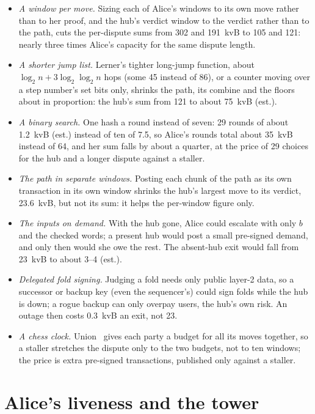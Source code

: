 \documentclass[11pt]{article}
\begin{document}
\begin{itemize}[leftmargin=1.5em]
\item \emph{A window per move.} Sizing each of Alice's windows to its
  own move rather than to her proof, and the hub's verdict window to the
  verdict rather than to the path, cuts the per-dispute sums from 302
  and 191~kvB to 105 and 121: nearly three times Alice's capacity for the
  same dispute length.
\item \emph{A shorter jump list.} Lerner's tighter long-jump function,
  about $\log_2 n + 3\log_2\log_2 n$ hops (some 45 instead of 86), or a
  counter moving over a step number's set bits only, shrinks the path,
  its combine and the floors about in proportion: the hub's sum from 121
  to about 75~kvB (est.).
\item \emph{A binary search.} One hash a round instead of seven: 29
  rounds of about 1.2~kvB (est.) instead of ten of 7.5, so Alice's rounds
  total about 35~kvB instead of 64, and her sum falls by about a quarter,
  at the price of 29 choices for the hub and a longer dispute against a
  staller.
\item \emph{The path in separate windows.} Posting each chunk of the
  path as its own transaction in its own window shrinks the hub's
  largest move to its verdict, 23.6~kvB, but not its sum: it helps the
  per-window figure only.
\item \emph{The inputs on demand.} With the hub gone, Alice could
  escalate with only $b$ and the checked words; a present hub would
  post a small pre-signed demand, and only then would she owe the rest.
  The absent-hub exit would fall from 23~kvB to about 3--4 (est.).
\item \emph{Delegated fold signing.} Judging a fold needs only public
  layer-2 data, so a successor or backup key (even the sequencer's) could
  sign folds while the hub is down; a rogue backup can only overpay
  users, the hub's own risk. An outage then costs 0.3~kvB an exit, not
  23.
\item \emph{A chess clock.} Union~\cite{union} gives each party a budget
  for all its moves together, so a staller stretches the dispute only to
  the two budgets, not to ten windows; the price is extra pre-signed
  transactions, published only against a staller.
\end{itemize}

\section{Alice's liveness and the tower}
\label{sec:tower}
\end{document}
